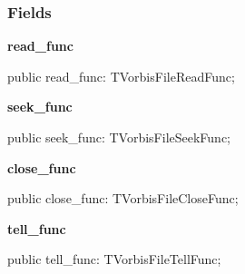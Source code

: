 \documentclass{report}
\newif\ifpdf
\begin{document}
\subsubsection*{\large{\textbf{Fields}}\normalsize\hspace{1ex}\hfill}
\begin{list}{}{
\setlength{\itemindent}{0cm}
\setlength{\listparindent}{0cm}
\setlength{\leftmargin}{\evensidemargin}
\addtolength{\leftmargin}{\tmplength}
\settowidth{\labelsep}{X}
\addtolength{\leftmargin}{\labelsep}
\setlength{\labelwidth}{\tmplength}
}
\label{ok_vorbisfile.Tov_callbacks-read_func}
\item[\textbf{read{\_}func}\hfill]
\ifpdf
\begin{flushleft}
\fi
\begin{ttfamily}
public read{\_}func: TVorbisFileReadFunc;\end{ttfamily}

\ifpdf
\end{flushleft}
\fi


\par  \label{ok_vorbisfile.Tov_callbacks-seek_func}
\item[\textbf{seek{\_}func}\hfill]
\ifpdf
\begin{flushleft}
\fi
\begin{ttfamily}
public seek{\_}func: TVorbisFileSeekFunc;\end{ttfamily}

\ifpdf
\end{flushleft}
\fi


\par  \label{ok_vorbisfile.Tov_callbacks-close_func}
\item[\textbf{close{\_}func}\hfill]
\ifpdf
\begin{flushleft}
\fi
\begin{ttfamily}
public close{\_}func: TVorbisFileCloseFunc;\end{ttfamily}

\ifpdf
\end{flushleft}
\fi


\par  \label{ok_vorbisfile.Tov_callbacks-tell_func}
\item[\textbf{tell{\_}func}\hfill]
\ifpdf
\begin{flushleft}
\fi
\begin{ttfamily}
public tell{\_}func: TVorbisFileTellFunc;\end{ttfamily}

\ifpdf
\end{flushleft}
\fi


\par  \end{list}
\ifpdf
\end{document}

